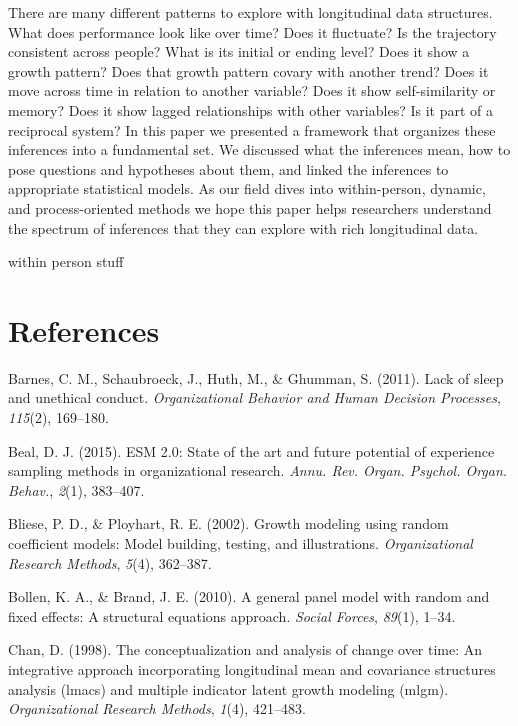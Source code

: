 \documentclass[english,,man]{apa6}
\theoremstyle{definition}
\theoremstyle{definition}
\theoremstyle{definition}
\theoremstyle{remark}
\begin{document}
There are many different patterns to explore with longitudinal data
structures. What does performance look like over time? Does it
fluctuate? Is the trajectory consistent across people? What is its
initial or ending level? Does it show a growth pattern? Does that growth
pattern covary with another trend? Does it move across time in relation
to another variable? Does it show self-similarity or memory? Does it
show lagged relationships with other variables? Is it part of a
reciprocal system? In this paper we presented a framework that organizes
these inferences into a fundamental set. We discussed what the
inferences mean, how to pose questions and hypotheses about them, and
linked the inferences to appropriate statistical models. As our field
dives into within-person, dynamic, and process-oriented methods we hope
this paper helps researchers understand the spectrum of inferences that
they can explore with rich longitudinal data.

within person stuff

\newpage

\hypertarget{references}{%
\section{References}\label{references}}

\setlength{\parindent}{-0.5in}
\setlength{\leftskip}{0.5in}

\hypertarget{refs}{}
\leavevmode\hypertarget{ref-barnes_lack_2011}{}%
Barnes, C. M., Schaubroeck, J., Huth, M., \& Ghumman, S. (2011). Lack of
sleep and unethical conduct. \emph{Organizational Behavior and Human
Decision Processes}, \emph{115}(2), 169--180.

\leavevmode\hypertarget{ref-beal_esm_2015}{}%
Beal, D. J. (2015). ESM 2.0: State of the art and future potential of
experience sampling methods in organizational research. \emph{Annu. Rev.
Organ. Psychol. Organ. Behav.}, \emph{2}(1), 383--407.

\leavevmode\hypertarget{ref-bliese_growth_2002}{}%
Bliese, P. D., \& Ployhart, R. E. (2002). Growth modeling using random
coefficient models: Model building, testing, and illustrations.
\emph{Organizational Research Methods}, \emph{5}(4), 362--387.

\leavevmode\hypertarget{ref-bollen_general_2010}{}%
Bollen, K. A., \& Brand, J. E. (2010). A general panel model with random
and fixed effects: A structural equations approach. \emph{Social
Forces}, \emph{89}(1), 1--34.

\leavevmode\hypertarget{ref-chan1998conceptualization}{}%
Chan, D. (1998). The conceptualization and analysis of change over time:
An integrative approach incorporating longitudinal mean and covariance
structures analysis (lmacs) and multiple indicator latent growth
modeling (mlgm). \emph{Organizational Research Methods}, \emph{1}(4),
421--483.
\end{document}
